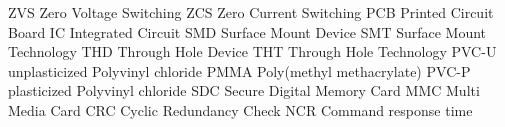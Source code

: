    {ZVS}    {Zero Voltage Switching}
   {ZCS}    {Zero Current Switching}
   {PCB}    {Printed Circuit Board}
    {IC}     {Integrated Circuit}
   {SMD}    {Surface Mount Device}
   {SMT}    {Surface Mount Technology}
   {THD}    {Through Hole Device}
   {THT}    {Through Hole Technology}
  {PVC-U}  {unplasticized Polyvinyl chloride}
  {PMMA}   {Poly(methyl methacrylate)}
  {PVC-P}  {plasticized Polyvinyl chloride}
   {SDC}    {Secure Digital Memory Card}
   {MMC}    {Multi Media Card}
   {CRC}    {Cyclic Redundancy Check}
   {NCR}    {Command response time}